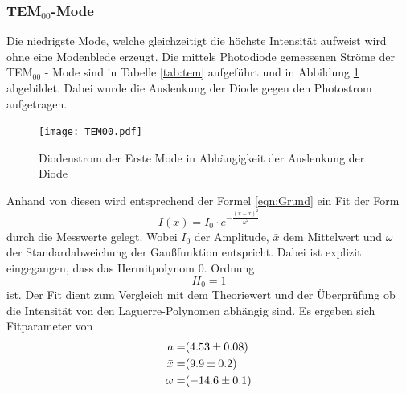 \subsubsection{TEM$_\text{00}$-Mode}
Die niedrigste Mode, welche gleichzeitigt die höchste Intensität aufweist wird ohne eine Modenblede erzeugt. Die mittels Photodiode gemessenen Ströme der TEM$_{00}$ - Mode sind in Tabelle \ref{tab:tem} aufgeführt und in Abbildung \ref{fig:TEM00} abgebildet. Dabei wurde die Auslenkung der Diode gegen den Photostrom aufgetragen.
\begin{figure}
  \centering
  \texttt{[image: TEM00.pdf]}
  \caption{Diodenstrom der Erste Mode in Abhängigkeit der Auslenkung der Diode}
  \label{fig:TEM00}
\end{figure}
Anhand von diesen wird entsprechend der Formel \ref{eqn:Grund} ein Fit der Form 
\begin{equation}
  I(x) = I_0 \cdot e^{- \frac{(x-\bar{x})^2}{\omega^2} }
  \label{eqn:gausian}
\end{equation}
durch die Messwerte gelegt. Wobei $I_0$ der Amplitude, $\bar{x}$ dem Mittelwert und $\omega$ der Standardabweichung der Gaußfunktion entspricht. Dabei ist explizit eingegangen, dass das Hermitpolynom 0. Ordnung 
\begin{equation}
  H_0 = 1
  \label{}
\end{equation}
ist. Der Fit dient zum Vergleich mit dem Theoriewert und der Überprüfung ob die Intensität von den Laguerre-Polynomen abhängig sind. Es ergeben sich Fitparameter von 
\begin{eqnarray}
  a =& (\num{4.53 +- 0.08})	\\
  \bar{x} =& (\num{9.9 +- 0.2})	\\
  \omega =& (\num{-14.6 +-0.1})	
  \label{eqn:coef}
\end{eqnarray}
